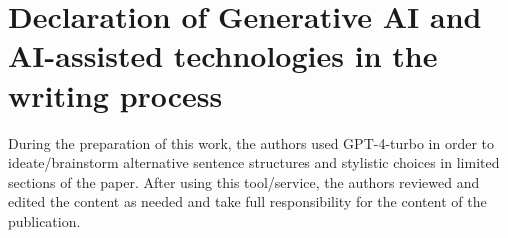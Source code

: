 \section*{Declaration of Generative AI and AI-assisted technologies in the writing process}

During the preparation of this work, the authors used GPT-4-turbo in order to ideate/brainstorm alternative sentence structures and stylistic choices in limited sections of the paper. After using this tool/service, the authors reviewed and edited the content as needed and take full responsibility for the content of the publication.